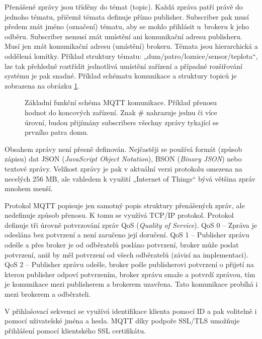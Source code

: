 Přenášené zprávy jsou tříděny do témat (topic). Každá zpráva patří právě do jednoho tématu, přičemž témata definuje přímo publisher. Subscriber pak musí předem znát jméno (označení) tématu, aby se mohlo přihlásit u~brokeru k jeho odběru. Subscriber nemusí znát umístění ani komunikační adresu publisheru. Musí jen znát komunikační adresu (umístění) brokeru. Témata jsou hierarchická a oddělená lomítky. Příklad struktury tématu: „dum/patro/loznice/sensor/teplota“, lze tak přehledně roztřídit jednotlivá umístění zařízení a případné rozšiřování systému je pak snadné. Příklad schématu komunikace a struktury topiců je zobrazena na obrázku \ref{fig:mqtt-protokol}.

\begin{figure}[H]
    \centering
    \def\svgwidth{\columnwidth}
    
    \caption[Základní funkční schéma MQTT komunikace.]{Základní funkční schéma MQTT komunikace. Příklad přenosu hodnot do koncových zařízení. Znak \# nahrazuje jednu či více úrovní, budou přijímány subscribers  všechny zprávy tykající se prvního patra domu.}
    \label{fig:mqtt-protokol}
\end{figure}

Obsahem zprávy není přesně definován. Nejčastěji se používá formát (způsob zápisu) dat JSON (\textit{JavaScript Object Notation}), BSON (\textit{Binary JSON}) nebo textové zprávy. Velikost zprávy je pak v aktuální verzi protokolu omezena na necelých 256 MB, ale vzhledem k využití „Internet of Things“ bývá většina zpráv mnohem menší.

Protokol MQTT popisuje jen samotný popis struktury přenášených zpráv, ale nedefinuje způsob přenosu. K tomu se využívá TCP/IP protokol. Protokol definuje tři úrovně potvrzování zpráv QoS (\textit{Quality of Service}). QoS 0 – Zpráva je odeslána bez potvrzení a není zaručeno její doručení. QoS 1 – Publisher zprávu odešle a přes broker je od odběratelů posláno potvrzení, broker může poslat potvrzení, aniž by měl potvrzení od všech odběratelů (závisí na implementaci). QoS 2 – Publisher zprávu odešle, broker pošle publisherovi potvrzení o přijetí na kterou publisher odpoví potvrzením, broker zprávu smaže a potvrdí zprávou, tím je komunikace mezi publisherem a brokerem uzavřena. Tato komunikace probíhá i mezi brokerem a odběrateli.


V přihlašovací sekvenci se využívá identifikace klienta pomocí ID a pak volitelně i pomocí uživatelské jména a hesla. MQTT díky podpoře SSL/TLS umožňuje přihlášení pomocí klientského SSL certifikátu.
